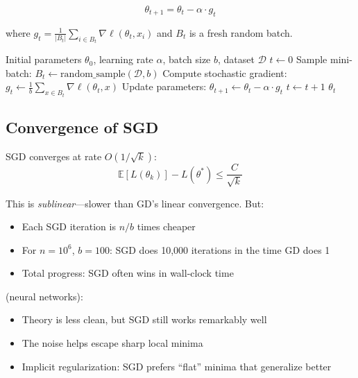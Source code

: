 \begin{equation}
    \boxed{\theta_{t+1} = \theta_t - \alpha \cdot g_t}
\end{equation}

where $g_t = \frac{1}{|B_t|} \sum_{i \in B_t} \nabla \ell(\theta_t, x_i)$ and $B_t$ is a fresh random batch.

\begin{algorithm}[H]
\caption{Stochastic Gradient Descent (SGD)}
\begin{algorithmic}[1]
    \Require Initial parameters $\theta_0$, learning rate $\alpha$, batch size $b$, dataset $\mathcal{D}$
    \State $t \gets 0$
        \State Sample mini-batch: $B_t \gets \text{random\_sample}(\mathcal{D}, b)$
        \State Compute stochastic gradient: $g_t \gets \frac{1}{b} \sum_{x \in B_t} \nabla \ell(\theta_t, x)$
        \State Update parameters: $\theta_{t+1} \gets \theta_t - \alpha \cdot g_t$
        \State $t \gets t + 1$
    \EndWhile
    \Return $\theta_t$
\end{algorithmic}
\end{algorithm}



\subsection{Convergence of SGD}

 SGD converges at rate $O(1/\sqrt{k})$:
\begin{equation}
    \mathbb{E}[L(\theta_k)] - L(\theta^*) \leq \frac{C}{\sqrt{k}}
\end{equation}


This is \emph{sublinear}---slower than GD's linear convergence. But:
\begin{itemize}
    \item Each SGD iteration is $n/b$ times cheaper
    \item For $n = 10^6$, $b = 100$: SGD does 10,000 iterations in the time GD does 1
    \item Total progress: SGD often wins in wall-clock time
\end{itemize}

 (neural networks):
\begin{itemize}
    \item Theory is less clean, but SGD still works remarkably well
    \item The noise helps escape sharp local minima
    \item Implicit regularization: SGD prefers ``flat'' minima that generalize better
\end{itemize}



